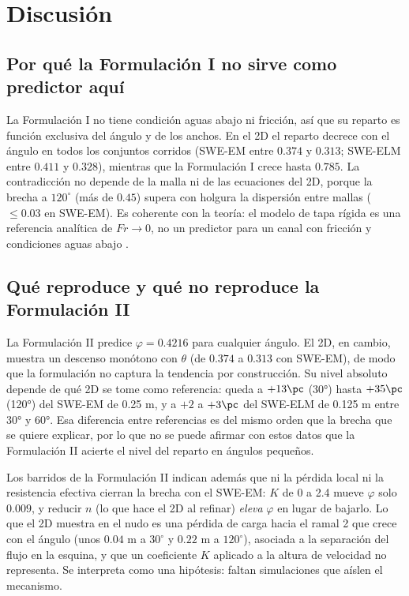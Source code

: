\section{Discusión}\label{sec:discusion}
\subsection{Por qué la Formulación I no sirve como predictor aquí}
La Formulación I no tiene condición aguas abajo ni fricción, así que su reparto es función exclusiva del ángulo y de los anchos. En el 2D el reparto decrece con el ángulo en todos los conjuntos corridos (SWE-EM entre $0.374$ y $0.313$; SWE-ELM entre $0.411$ y $0.328$), mientras que la Formulación I crece hasta $0.785$. La contradicción no depende de la malla ni de las ecuaciones del 2D, porque la brecha a $120^\circ$ (más de $0.45$) supera con holgura la dispersión entre mallas ($\leq0.03$ en SWE-EM). Es coherente con la teoría: el modelo de tapa rígida es una referencia analítica de $Fr\to0$, no un predictor para un canal con fricción y condiciones aguas abajo \citep{batchelor1967,milnethomson1962}.

\subsection{Qué reproduce y qué no reproduce la Formulación II}
La Formulación II predice $\varphi=0.4216$ para cualquier ángulo. El 2D, en cambio, muestra un descenso monótono con $\theta$ (de $0.374$ a $0.313$ con SWE-EM), de modo que la formulación no captura la tendencia por construcción. Su nivel absoluto depende de qué 2D se tome como referencia: queda a $+13\pc$ (30°) hasta $+35\pc$ (120°) del SWE-EM de 0.25 m, y a $+2$ a $+3\pc$ del SWE-ELM de 0.125 m entre 30° y 60°. Esa diferencia entre referencias es del mismo orden que la brecha que se quiere explicar, por lo que no se puede afirmar con estos datos que la Formulación II acierte el nivel del reparto en ángulos pequeños.

Los barridos de la Formulación II indican además que ni la pérdida local ni la resistencia efectiva cierran la brecha con el SWE-EM: $K$ de 0 a 2.4 mueve $\varphi$ solo $0.009$, y reducir $n$ (lo que hace el 2D al refinar) \emph{eleva} $\varphi$ en lugar de bajarlo. Lo que el 2D muestra en el nudo es una pérdida de carga hacia el ramal 2 que crece con el ángulo (unos $0.04$ m a $30^\circ$ y $0.22$ m a $120^\circ$), asociada a la separación del flujo en la esquina, y que un coeficiente $K$ aplicado a la altura de velocidad no representa. Se interpreta como una hipótesis: faltan simulaciones que aíslen el mecanismo.

